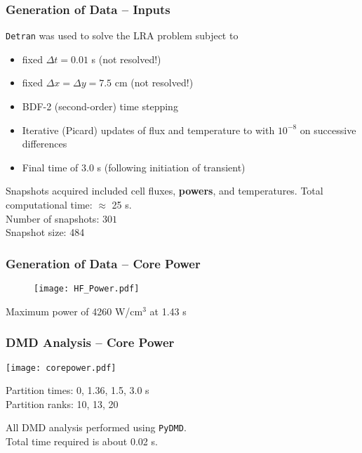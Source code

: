 \documentclass[fleqn]{beamer}
\begin{document}
\begin{frame}
\frametitle{Generation of Data -- Inputs}

{\tt Detran} was used to solve the LRA problem subject to
\begin{itemize}
  \item fixed $\Delta t = 0.01$ s (not resolved!)
  \item fixed $\Delta x = \Delta y = 7.5$ cm (not resolved!)
  \item BDF-2 (second-order) time stepping
  \item Iterative (Picard) updates of flux and temperature to with $10^{-8}$ on successive differences
  \item Final time of 3.0 s (following initiation of transient)
\end{itemize}
\vfill
Snapshots acquired included cell fluxes, {\bf powers}, and temperatures.
\vfill 
Total computational time: $\approx$ 25 s. \\
Number of snapshots: $301$\\
Snapshot size: 484 
\vfill 

\end{frame}

\begin{frame}
\frametitle{Generation of Data -- Core Power}

\begin{figure}[ht]
\texttt{[image: HF\_Power.pdf]}
\end{figure}
Maximum power of 4260 W/cm$^3$ at 1.43 s
\end{frame}



\begin{frame}
\frametitle{DMD Analysis -- Core Power}

\texttt{[image: corepower.pdf]}

Partition times: 0, 1.36, 1.5, 3.0 s\\
Partition ranks: 10, 13, 20

All DMD analysis performed using {\tt PyDMD}.  \\
Total time required is about 0.02 s.

\end{frame}
\end{document}
